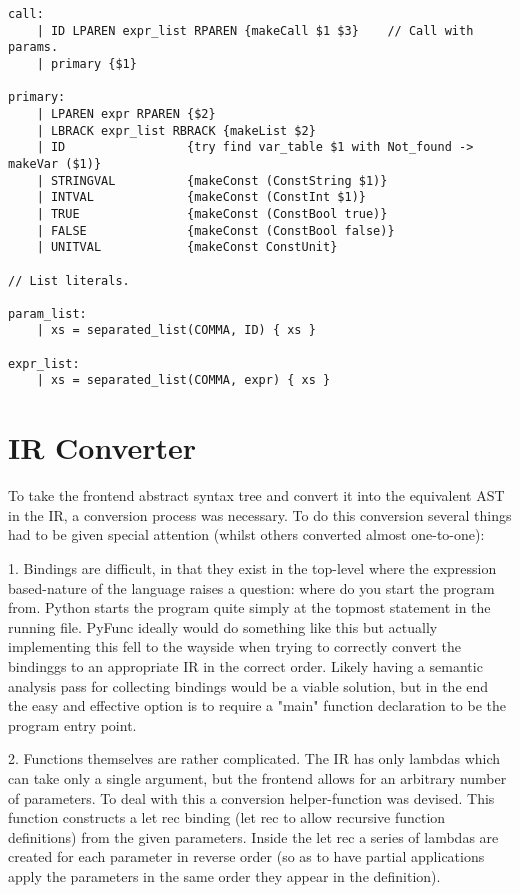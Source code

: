 \documentclass{l4proj}
\begin{document}
\begin{lstlisting}[caption=PyFunc's full frontend grammar rules for Menhir., keepspaces=true]
call:
    | ID LPAREN expr_list RPAREN {makeCall $1 $3}    // Call with params.
    | primary {$1}

primary:
    | LPAREN expr RPAREN {$2}
    | LBRACK expr_list RBRACK {makeList $2}
    | ID                 {try find var_table $1 with Not_found -> makeVar ($1)}
    | STRINGVAL          {makeConst (ConstString $1)}
    | INTVAL             {makeConst (ConstInt $1)}
    | TRUE               {makeConst (ConstBool true)}
    | FALSE              {makeConst (ConstBool false)}
    | UNITVAL            {makeConst ConstUnit}

// List literals.

param_list:
    | xs = separated_list(COMMA, ID) { xs }

expr_list:
    | xs = separated_list(COMMA, expr) { xs }
\end{lstlisting}

\section{IR Converter}

To take the frontend abstract syntax tree and convert it into the equivalent AST in the IR, a conversion process was necessary.
To do this conversion several things had to be given special attention (whilst others converted almost one-to-one):

1. Bindings are difficult, in that they exist in the top-level where the expression based-nature of the language raises a question: where do you start the program from.
Python starts the program quite simply at the topmost statement in the running file.
PyFunc ideally would do something like this but actually implementing this fell to the wayside when trying to correctly convert the bindinggs to an appropriate IR in the correct order.
Likely having a semantic analysis pass for collecting bindings would be a viable solution, but in the end the easy and effective option is to require a "main" function declaration to be the program entry point.

2. Functions themselves are rather complicated.
The IR has only lambdas which can take only a single argument, but the frontend allows for an arbitrary number of parameters.
To deal with this a conversion helper-function was devised.
This function constructs a let rec binding (let rec to allow recursive function definitions) from the given parameters.
Inside the let rec a series of lambdas are created for each parameter in reverse order (so as to have partial applications apply the parameters in the same order they appear in the definition).
\end{document}
